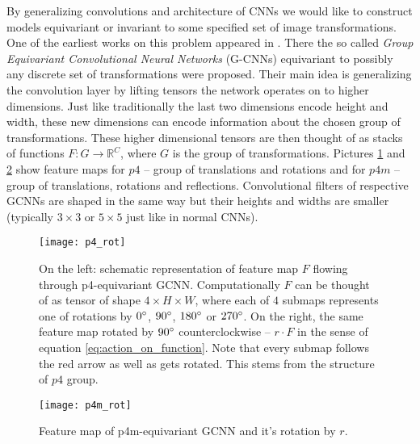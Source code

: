     By generalizing convolutions and architecture of CNNs we would like to
    construct models
    equivariant or invariant to some specified set of image transformations.
    One of the earliest works on this problem appeared in \cite{cohen2016}. There
    the so called \textit{Group Equivariant Convolutional Neural Networks}
    (G-CNNs) equivariant to possibly any discrete set of transformations were
    proposed. Their main idea is generalizing the convolution layer by
    lifting tensors the network operates on to higher dimensions.
    Just like traditionally the last two
    dimensions encode height and width, these new dimensions can
    encode information about the chosen group of transformations. These higher
    dimensional tensors are then thought of as stacks of functions
    $F:G\to\mathbb{R}^C$, where $G$ is the group of transformations.
    Pictures \ref{fig:p4_rot} and \ref{fig:p4m_rot} show
    feature maps for $p4$ -- group of translations and rotations and for
    $p4m$ -- group of
    translations, rotations and reflections.
    Convolutional filters of respective GCNNs are shaped in the same way
    but their heights and widths are smaller (typically $3\times3$ or $5\times5$
    just like in normal CNNs).
    \begin{figure}[h]
        \centering
        \texttt{[image: p4\_rot]}
        \caption{On the left: schematic representation of feature map $F$ flowing through
            p4-equivariant GCNN. Computationally $F$ can be thought of as tensor of shape
            $4\times H \times W$, where each of $4$ submaps represents one of
            rotations by $0\degree$, $90\degree$, $180\degree$ or $270\degree$.
            On the right, the same feature map rotated by
            $90 \degree$ counterclockwise -- $r\cdot F$ in the sense of equation
            \ref{eq:action_on_function}. Note that every submap follows the
            red arrow as well as gets rotated. This stems from the structure of
            $p4$ group.}
        \label{fig:p4_rot}
    \end{figure}
    \begin{figure}[h]
        \centering
        \texttt{[image: p4m\_rot]}
        \caption{Feature map of p4m-equivariant GCNN and it's rotation by $r$.}
        \label{fig:p4m_rot}
    \end{figure}


